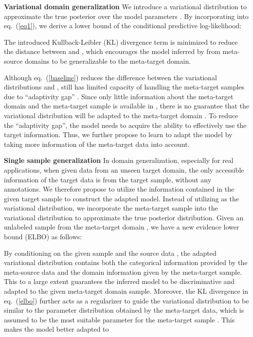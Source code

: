 \documentclass{article} \usepackage[table]{xcolor}
\begin{document}
\textbf{Variational domain generalization} 
We introduce  a variational distribution  to approximate the true posterior over the model parameters . By incorporating  into eq.~(\ref{eq1}), we derive a lower bound of the conditional predictive log-likelihood:

The introduced Kullback-Leibler (KL) divergence term is minimized to reduce the distance between  and , which encourages the model  inferred by  from meta-source domains to be generalizable to the meta-target domain.


Although eq.~(\ref{baseline}) reduces the difference between the variational distributions  and , 
 still has limited capacity of handling the meta-target samples due to ``adaptivity gap'' \citep{dubey2021adaptive}.
Since only little information about the meta-target domain  and the meta-target sample  is available in , there is no guarantee that the variational distribution  will be adapted to the meta-target domain . 
To reduce the ``adaptivity gap'', the model needs to acquire the ability to effectively use the target information.
Thus, we further propose to learn to adapt the model  by taking more information of the meta-target data into account.

\textbf{Single sample generalization} In domain generalization, especially for real applications, when given data from an unseen target domain, the only accessible information of the target data is from the target sample, without any annotations.
We therefore propose to utilize the information contained in the given target sample to construct the adapted model. 
Instead of utilizing  as the variational distribution,
we incorporate the meta-target sample  into the variational distribution  to approximate the true posterior distribution. Given an unlabeled sample  from the meta-target domain , we have a new evidence lower bound (ELBO) as follows:



By conditioning on the given sample  and the source data , the adapted variational distribution  contains both the categorical information provided by the meta-source data and the domain information given by the meta-target sample. 
This to a large extent guarantees the inferred model to be discriminative and adapted to the given meta-target domain sample. 
Moreover, the KL divergence in eq.~(\ref{elbo}) further acts as a regularizer to guide the variational distribution to be similar to the parameter distribution  obtained by the meta-target data, which is assumed to be the most suitable parameter for the meta-target sample . This makes the model better adapted to 
\end{document}
